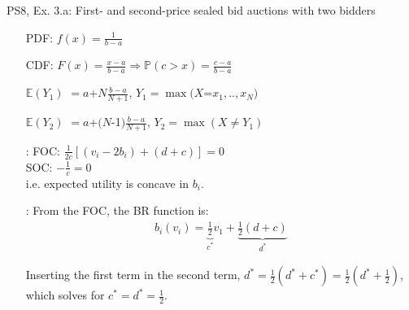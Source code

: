 \begin{frame}{PS8, Ex. 3.a: First- and second-price sealed bid auctions with two bidders}
\begin{multicols}{2}
\begin{enumerate}
        \item[PDF:] $f(x)=\frac{1}{b-a}$
        \item[CDF:] $F(x)=\frac{x-a}{b-a}\Rightarrow\mathbb{P}(c>x)=\frac{c-a}{b-a}$
        \item[$\mathbb{E}(Y_1)$] $=a$+$N\frac{b-a}{N+1}$, $Y_1=\max(X$=$x_1,..,x_N)$
        \item[$\mathbb{E}(Y_2)$] $=a$+$(N$-1$)\frac{b-a}{N+1}$, $Y_2=\max(X\neq Y_1)$
        \item[\nth{2}:] FOC: $\frac{1}{2c}[(v_i-2b_i)+(d+c)]=0$\\
                        SOC: $-\frac{1}{c}=0$\\
                        i.e. expected utility is concave in $b_i$.
        \item[\nth{3}:] From the FOC, the BR function is:\vspace{-6pt}
                        \begin{align*}
                          b_i(v_i)=\underbrace{\frac{1}{2}}_{c^*}v_1+\underbrace{\frac{1}{2}(d+c)}_{d^*}
                        \end{align*}
        \item[]         \vspace{-6pt} Inserting the first term in the second term, $d^*=\frac{1}{2}(d^*+c^*)=\frac{1}{2}(d^*+\frac{1}{2})$, which solves for $c^*=d^*=\frac{1}{2}$.
      \end{enumerate}
      \vfill\null
    \end{multicols}
\end{frame}


